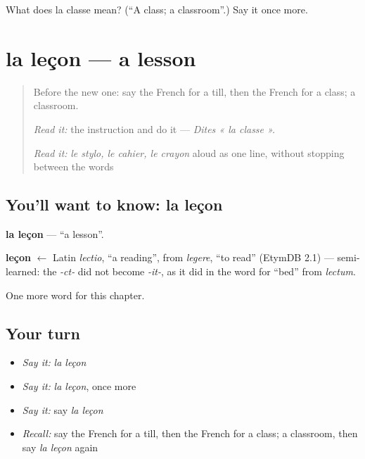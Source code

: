 \begin{tcolorbox}[breakable,colback=teal!4,colframe=teal!35!black,title={Before you move on}]
What does la classe mean? (\textquotedblleft{}A class; a classroom\textquotedblright{}.) Say it once more.
\end{tcolorbox}
\section[la leçon]{la leçon — a lesson}

\label{lesson:FR-C126-lecon}



\begin{quote}
Before the new one: say the French for a till, then the French for a class; a classroom.

\emph{Read it:} the instruction and do it — \emph{Dites « la classe ».}

\emph{Read it:} \emph{le stylo, le cahier, le crayon} aloud as one line, without stopping between the words
\end{quote}

\subsection*{You'll want to know: la leçon}
\textbf{la leçon} — \textquotedblleft{}a lesson\textquotedblright{}.

\begin{cousinweb}
\textbf{leçon} $\leftarrow$ Latin \emph{lectio}, \textquotedblleft{}a reading\textquotedblright{}, from \emph{legere}, \textquotedblleft{}to read\textquotedblright{} (EtymDB 2.1) — semi-learned: the \emph{-ct-} did not become \emph{-it-}, as it did in the word for \textquotedblleft{}bed\textquotedblright{} from \emph{lectum}.
\end{cousinweb}

\begin{grammarlens}[title={What you've built}]
One more word for this chapter.
\end{grammarlens}

\subsection*{Your turn}
\begin{itemize}
\raggedright
  \item \emph{Say it:} \emph{la leçon}
  \item \emph{Say it:} \emph{la leçon}, once more
  \item \emph{Say it:} say \emph{la leçon}
  \item \emph{Recall:} say the French for a till, then the French for a class; a classroom, then say \emph{la leçon} again
\end{itemize}

